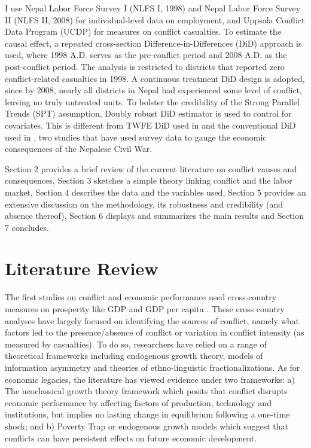 \documentclass[12pt,a4paper]{article}
\begin{document}
I use Nepal Labor Force Survey I (NLFS I, 1998) and Nepal Labor Force Survey II (NLFS II, 2008) for individual-level data on employment, and Uppsala Conflict Data Program (UCDP) for measures on conflict casualties. To estimate the causal effect, a repeated cross-section Difference-in-Differences (DiD) approach is used, where 1998 A.D. serves as the pre-conflict period and 2008 A.D. as the post-conflict period. The analysis is restricted to districts that reported zero conflict-related casualties in 1998. A continuous treatment DiD design is adopted, since by 2008, nearly all districts in Nepal had experienced some level of conflict, leaving no truly untreated units. To bolster the credibility of the Strong Parallel Trends (SPT) assumption, Doubly robust DiD estimator is used to control for covariates. This is different from TWFE DiD used in \textcite{menon2015war} and the conventional DiD used in \textcite{valente2014education}, two studies that have used survey data to gauge the economic consequences of the Nepalese Civil War.


Section 2 provides a brief review of the current literature on conflict causes and consequences, Section 3 sketches a simple theory linking conflict and the labor market, Section 4 describes the data and the variables used, Section 5 provides an extensive discussion on the methodology, its robustness and credibility (and absence thereof), Section 6 displays and summarizes the main results and Section 7 concludes. 

\section{Literature Review}


The first studies on conflict and economic performance used cross-country measures on prosperity like GDP and GDP per capita \parencite{blattman2010civil}. These cross country analyses have largely focused on identifying the sources of conflict, namely what factors led to the presence/absence of conflict or  variation in conflict intensity (as measured by casualties). To do so, researchers have relied on a range of theoretical frameworks including endogenous growth theory, models of information asymmetry and theories of ethno-linguistic fractionalizations. As for economic legacies, the literature has viewed evidence under two frameworks: a) The neoclassical growth theory framework which posits that conflict disrupts economic performance by affecting factors of production, technology and institutions, but implies no lasting change in equilibrium following a one-time shock; and b) Poverty Trap or endogenous growth models which suggest that conflicts can have persistent effects on future economic development.
\end{document}
